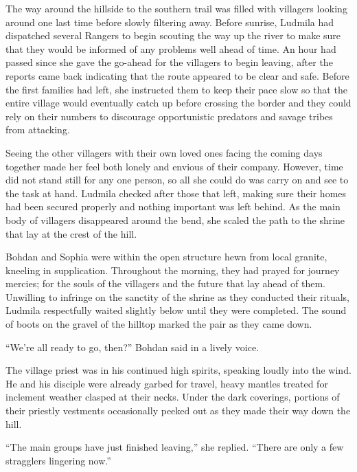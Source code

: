 The way around the hillside to the southern trail was filled with villagers looking around one last time before slowly filtering away. Before sunrise, Ludmila had dispatched several Rangers to begin scouting the way up the river to make sure that they would be informed of any problems well ahead of time. An hour had passed since she gave the go-ahead for the villagers to begin leaving, after the reports came back indicating that the route appeared to be clear and safe. Before the first families had left, she instructed them to keep their pace slow so that the entire village would eventually catch up before crossing the border and they could rely on their numbers to discourage opportunistic predators and savage tribes from attacking.

 

Seeing the other villagers with their own loved ones facing the coming days together made her feel both lonely and envious of their company. However, time did not stand still for any one person, so all she could do was carry on and see to the task at hand. Ludmila checked after those that left, making sure their homes had been secured properly and nothing important was left behind. As the main body of villagers disappeared around the bend, she scaled the path to the shrine that lay at the crest of the hill.

 

Bohdan and Sophia were within the open structure hewn from local granite, kneeling in supplication. Throughout the morning, they had prayed for journey mercies; for the souls of the villagers and the future that lay ahead of them. Unwilling to infringe on the sanctity of the shrine as they conducted their rituals, Ludmila respectfully waited slightly below until they were completed. The sound of boots on the gravel of the hilltop marked the pair as they came down.

 

“We’re all ready to go, then?” Bohdan said in a lively voice.

 

The village priest was in his continued high spirits, speaking loudly into the wind. He and his disciple were already garbed for travel, heavy mantles treated for inclement weather clasped at their necks. Under the dark coverings, portions of their priestly vestments occasionally peeked out as they made their way down the hill.

 

“The main groups have just finished leaving,” she replied. “There are only a few stragglers lingering now.”


